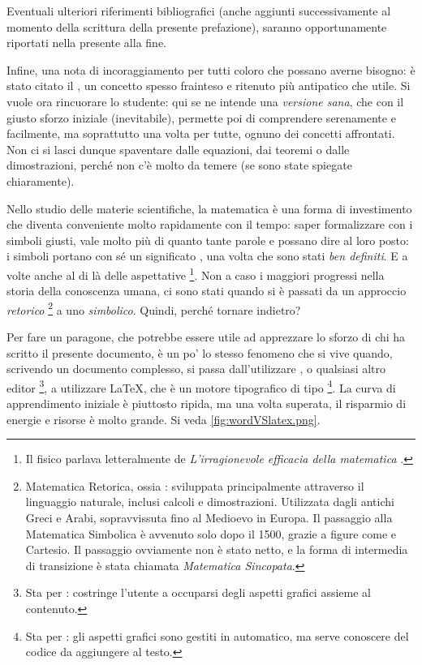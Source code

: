 Eventuali ulteriori riferimenti bibliografici (anche aggiunti successivamente al
momento della scrittura della presente prefazione), saranno opportunamente
riportati nella \textbf{} presente alla fine.

Infine, una nota di incoraggiamento per tutti coloro che possano averne bisogno:
è stato citato il , un concetto spesso frainteso e
ritenuto più antipatico che utile. Si vuole ora rincuorare lo studente: qui se
ne intende una \emph{versione sana}, che con il giusto sforzo iniziale
(inevitabile), permette poi di comprendere serenamente e facilmente, ma
soprattutto una volta per tutte, ognuno dei concetti affrontati. Non ci si lasci
dunque spaventare dalle equazioni, dai teoremi o dalle dimostrazioni, perché non
c'è molto da temere (se sono state spiegate chiaramente).

Nello studio delle materie scientifiche, la matematica è una forma di
investimento che diventa conveniente molto rapidamente con il tempo: saper
formalizzare con i simboli giusti, vale molto più di quanto tante parole e
 possano dire al loro posto: i simboli portano
con sé un significato , una volta che sono stati \emph{ben
definiti}. E a volte anche al di là delle aspettative%
\footnote{Il fisico  parlava letteralmente de
\emph{L'irragionevole efficacia della matematica} \autocite{wigner}.}.
Non a caso i maggiori progressi nella storia della conoscenza umana, ci sono
stati quando si è passati da un approccio \emph{retorico}%
\footnote{Matematica Retorica, ossia : sviluppata principalmente
attraverso il linguaggio naturale, inclusi calcoli e dimostrazioni. Utilizzata
dagli antichi Greci e Arabi, sopravvissuta fino al Medioevo in Europa. Il
passaggio alla Matematica Simbolica è avvenuto solo dopo il 1500, grazie a
figure come  e Cartesio. Il passaggio ovviamente non è stato netto, e
la forma di intermedia di transizione è stata chiamata \emph{Matematica
Sincopata}.} a uno \emph{simbolico}.
Quindi, perché tornare indietro?

Per fare un paragone, che potrebbe essere utile ad apprezzare lo sforzo di chi
ha scritto il presente documento, è un po' lo stesso fenomeno che si vive
quando, scrivendo un documento complesso, si passa dall'utilizzare
\emph{}, o qualsiasi altro editor \emph{}%
\footnote{Sta per \emph{}: costringe
l'utente a occuparsi degli aspetti grafici assieme al contenuto.},
a utilizzare \LaTeX, che è un motore tipografico di tipo \emph{}%
\footnote{Sta per \emph{}: gli aspetti grafici
sono gestiti in automatico, ma serve conoscere del codice da aggiungere al
testo.}.
La curva di apprendimento iniziale è piuttosto ripida, ma una volta
superata, il risparmio di energie e risorse è molto grande. Si veda
\cref{fig:wordVSlatex.png}.
%

